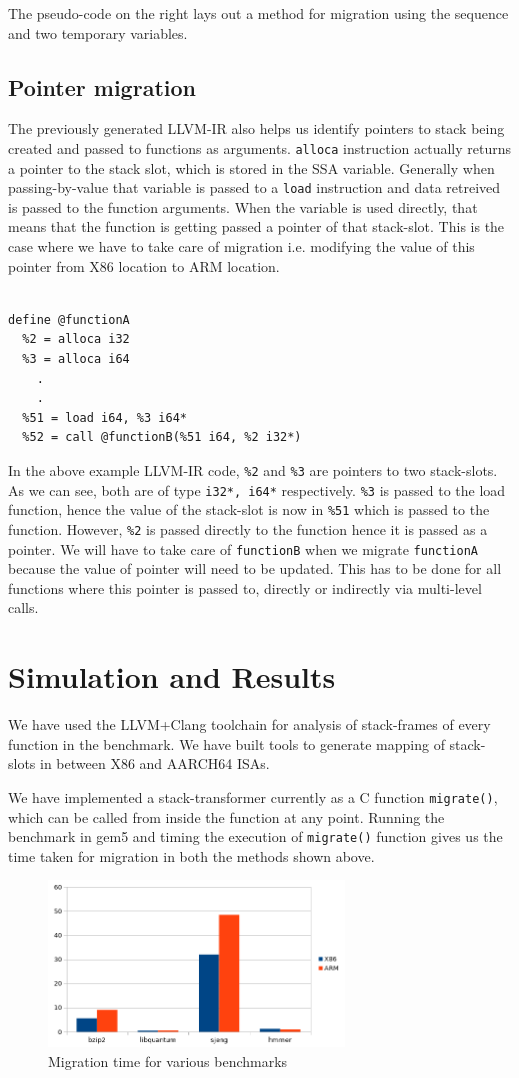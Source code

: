 \documentclass[a4paper]{article}
\begin{document}
The pseudo-code on the right lays out a method for migration using the sequence and two temporary variables.

\subsection{Pointer migration}

The previously generated LLVM-IR also helps us identify pointers to stack being created and passed to functions as arguments.
\texttt{alloca} instruction actually returns a pointer to the stack slot, which is stored in the SSA variable.
Generally when passing-by-value that variable is passed to a \texttt{load} instruction and data retreived is passed to the function arguments.
When the variable is used directly, that means that the function is getting passed a pointer of that stack-slot.
This is the case where we have to take care of migration i.e.
modifying the value of this pointer from X86 location to ARM location.
\\
\\
\begin{lstlisting}
define @functionA
  %2 = alloca i32
  %3 = alloca i64
    .
    .
  %51 = load i64, %3 i64*
  %52 = call @functionB(%51 i64, %2 i32*)
\end{lstlisting}

In the above example LLVM-IR code, \texttt{\%2} and \texttt{\%3} are pointers to two stack-slots.
As we can see, both are of type \texttt{i32*, i64*} respectively.
\texttt{\%3} is passed to the load function, hence the value of the stack-slot is now in \texttt{\%51} which is passed to the function.
However, \texttt{\%2} is passed directly to the function hence it is passed as a pointer.
We will have to take care of \texttt{functionB} when we migrate \texttt{functionA} because the value of pointer will need to be updated.
This has to be done for all functions where this pointer is passed to, directly or indirectly via multi-level calls.

\section{Simulation and Results}

We have used the LLVM+Clang toolchain for analysis of stack-frames of every function in the benchmark.
We have built tools to generate mapping of stack-slots in between X86 and AARCH64 ISAs.

We have implemented a stack-transformer currently as a C function \texttt{migrate()}, which can be called from inside the function at any point.
Running the benchmark in gem5 and timing the execution of \texttt{migrate()} function gives us the time taken for migration in both the methods shown above.

\begin{figure}[H]
\centering
\includegraphics[width=0.7\textwidth]{avg_migration_time}
\caption{\label{fig:avg_migration_time}Migration time for various benchmarks}
\end{figure}
\end{document}
